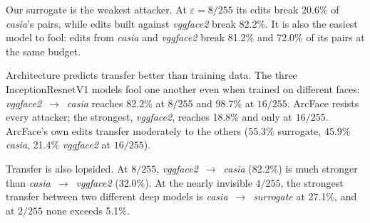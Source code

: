 \documentclass[conference]{IEEEtran}
\begin{document}
Our surrogate is the weakest attacker. At $\varepsilon = 8/255$ its edits break 20.6\% of \emph{casia}'s pairs,
while edits built against \emph{vggface2} break 82.2\%. It is also the easiest model to fool: edits from
\emph{casia} and \emph{vggface2} break 81.2\% and 72.0\% of its pairs at the same budget.

Architecture predicts transfer better than training data. The three InceptionResnetV1 models fool one another
even when trained on different faces: \emph{vggface2}~$\to$~\emph{casia} reaches 82.2\% at $8/255$ and 98.7\% at
$16/255$. ArcFace resists every attacker; the strongest, \emph{vggface2}, reaches 18.8\% and only at $16/255$.
ArcFace's own edits transfer moderately to the others (55.3\% surrogate, 45.9\% \emph{casia}, 21.4\%
\emph{vggface2} at $16/255$).

Transfer is also lopsided. At $8/255$, \emph{vggface2}~$\to$~\emph{casia} (82.2\%) is much stronger than
\emph{casia}~$\to$~\emph{vggface2} (32.0\%). At the nearly invisible $4/255$, the strongest transfer between two
different deep models is \emph{casia}~$\to$~\emph{surrogate} at 27.1\%, and at $2/255$ none exceeds 5.1\%.
\end{document}
